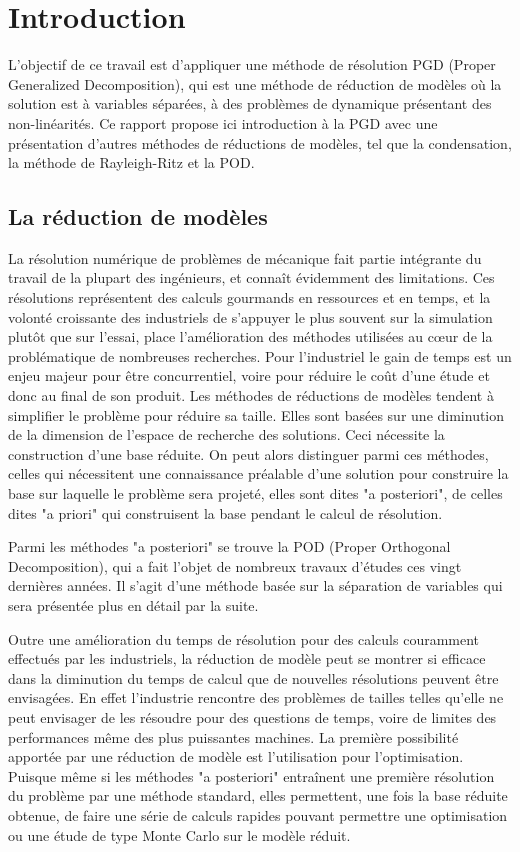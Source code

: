 \chapter{Introduction}
L'objectif de ce travail est d'appliquer une méthode de résolution PGD (Proper Generalized Decomposition), qui est une méthode de réduction de modèles où la solution est à variables séparées, à des problèmes de dynamique présentant des non-linéarités. Ce rapport propose ici introduction à la PGD avec une présentation d'autres méthodes de réductions de modèles, tel que la condensation, la méthode de Rayleigh-Ritz et la POD.

\section{La réduction de modèles}
La résolution numérique de problèmes de mécanique fait partie intégrante du travail de la plupart des ingénieurs, et connaît évidemment des limitations. Ces résolutions représentent des calculs gourmands en ressources et en temps, et la volonté croissante des industriels de s'appuyer le plus souvent sur la simulation plutôt que sur l'essai, place l'amélioration des méthodes utilisées au cœur de la problématique de nombreuses recherches. Pour l'industriel le gain de temps est un enjeu majeur pour être concurrentiel, voire pour réduire le coût d'une étude et donc au final de son produit. Les méthodes de réductions de modèles tendent à simplifier le problème pour réduire sa taille. Elles sont basées sur une diminution de la dimension de l'espace de recherche des solutions. Ceci nécessite la construction d'une
base réduite. On peut alors distinguer parmi ces méthodes, celles qui nécessitent une connaissance préalable d'une solution pour construire la base sur laquelle le problème sera projeté, elles sont dites "a posteriori", de celles dites "a priori" qui construisent la base pendant le calcul de résolution. 

Parmi les méthodes "a posteriori" se trouve la POD (Proper Orthogonal Decomposition), qui a fait l'objet de nombreux travaux d'études ces vingt dernières années. Il s'agit d'une méthode basée sur la séparation de variables qui sera présentée plus en détail par la suite. 

Outre une amélioration du temps de résolution pour des calculs couramment effectués par les industriels, la réduction de modèle peut se montrer si efficace dans la diminution du temps de calcul que de nouvelles résolutions peuvent être envisagées. En effet l'industrie rencontre des problèmes de tailles telles qu'elle ne peut envisager de les résoudre pour des questions de temps, voire de limites des performances même des plus puissantes machines. La première possibilité apportée par une réduction de modèle est l'utilisation pour l'optimisation. Puisque même si les méthodes "a posteriori" entraînent une première résolution du problème par une méthode standard, elles permettent, une fois la base réduite obtenue, de faire une série de calculs rapides pouvant permettre une optimisation ou une étude de type Monte Carlo sur le modèle réduit.

